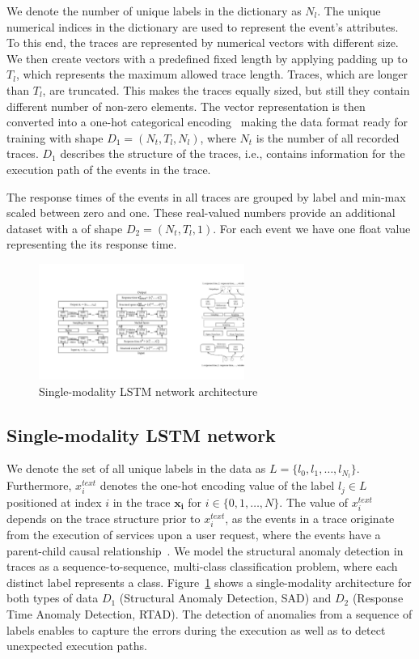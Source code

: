 We denote the number of unique labels in the dictionary as $N_l$. The unique numerical indices in the dictionary are used to represent the event's attributes. To this end, the traces are represented by numerical vectors with different size. We then create vectors with a predefined fixed length by applying padding up to $T_l$, which represents the maximum allowed trace length. Traces, which are longer than $T_l$, are truncated. This makes the traces equally sized, but still they contain different number of non-zero elements. The vector representation is then converted into a one-hot categorical encoding~\cite{nasrabadi2007pattern} making the data format ready for training with shape $D_1 = (N_t, T_l, N_l)$, where $N_t$ is the number of all recorded traces. $D_1$ describes the structure of the traces, i.e., contains information for the execution path of the events in the trace.

The response times of the events in all traces are grouped by label and min-max scaled between zero and one. These real-valued numbers provide an additional dataset with a of shape $D_2 = (N_t, T_l, 1)$. For each event we have one float value representing the its response time.

\begin{figure}[!b]
\centerline{\includegraphics[width=0.6\textwidth]{gfx/chap6/singlemodality.pdf}}
\caption{Single-modality LSTM network architecture}
\label{lstmstructural}
\end{figure}

\subsection{Single-modality LSTM network} \label{singlemodal}

We denote the set of all unique labels in the data as $L=\{l_0, l_1, \dots, l_{N_l}\}$. Furthermore, $x_{i}^{text}$ denotes the one-hot encoding value of the label $l_j \in L$ positioned at index $i$ in the trace $\mathbf{x_i}$ for $i \in \{0, 1, \dots, N\}$. The value of $x_{i}^{text}$ depends on the trace structure prior to $x_{i}^{text}$, as the events in a trace originate from the execution of services upon a user request, where the events have a parent-child causal relationship~\cite{openzipkin}. We model the structural anomaly detection in traces as a sequence-to-sequence, multi-class classification problem, where each distinct label represents a class. Figure~\ref{lstmstructural} shows a single-modality architecture for both types of data $D_1$ (Structural Anomaly Detection, SAD) and $D_2$ (Response Time Anomaly Detection, RTAD). The detection of anomalies from a sequence of labels enables to capture the errors during the execution as well as to detect unexpected execution paths. 

